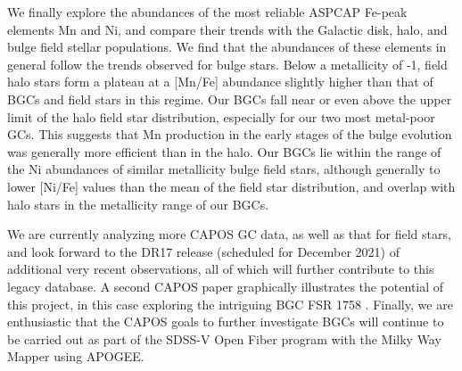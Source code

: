 \documentclass[onecolumn]{aa}
\begin{document}
We finally explore the abundances of the most reliable ASPCAP Fe-peak elements Mn and Ni, and compare  their trends with the Galactic disk, halo, and bulge field stellar populations. We find that the abundances of these elements in general follow the trends observed for bulge stars. 
Below a metallicity of -1, field halo stars form a plateau at a [Mn/Fe] abundance slightly higher than that of BGCs and field stars in this regime. Our
BGCs fall near or even above the upper limit of the halo field star distribution, especially for our two most metal-poor GCs. This suggests that Mn production in the early stages of the bulge evolution was generally more efficient than in the halo.
Our BGCs lie within the range of the Ni abundances of similar metallicity bulge field stars, although generally to lower
[Ni/Fe] values than the mean of the field star distribution, 
and overlap with  halo stars in the metallicity range of our BGCs.

We are currently analyzing more CAPOS GC data, as well as that for field stars, and  look forward to the DR17 release (scheduled for December 2021) of additional very recent observations, all of which will further contribute to this legacy database. A second CAPOS paper 
graphically illustrates the potential of 
this project, in this case exploring
the intriguing BGC FSR 1758 \citep{Romero-Colmenares2021}. 
Finally, we are enthusiastic that the CAPOS goals to further investigate BGCs will continue to be carried out as part of the SDSS-V Open Fiber program with the Milky Way Mapper using APOGEE.
\end{document}
